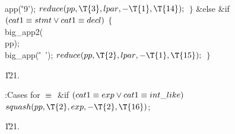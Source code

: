 \\{app}(\.{'9'});\6
${}\\{reduce}(\\{pp},\39\T{3},\39\\{lpar},\39{-}\T{1},\39\T{14});{}$\6
\4${}\}{}$\2\6
\&{else} \&{if} ${}(\\{cat1}\equiv\\{stmt}\lor\\{cat1}\equiv\\{decl}){}$\5
${}\{{}$\1\6
\\{big\_app2}(\\{pp});\6
\\{big\_app}(\.{'\ '});\6
${}\\{reduce}(\\{pp},\39\T{2},\39\\{lpar},\39{-}\T{1},\39\T{15});{}$\6
\4${}\}{}$\2\par
\U121.\fi

\B{}:Cases for \X${}\equiv{}$\6
\&{if} ${}(\\{cat1}\equiv\\{exp}\lor\\{cat1}\equiv\\{int\_like}){}$\1\5
${}\\{squash}(\\{pp},\39\T{2},\39\\{exp},\39{-}\T{2},\39\T{16}){}$;\2\par
\U121.\fi

